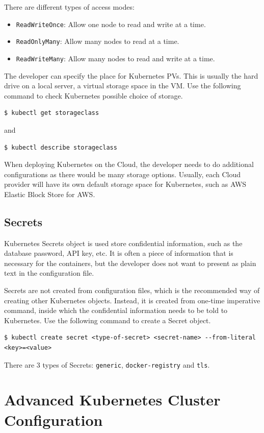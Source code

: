There are different types of access modes:
\begin{itemize}
	\item \verb|ReadWriteOnce|: Allow one node to read and write at a time.
	\item \verb|ReadOnlyMany|: Allow many nodes to read at a time.
	\item \verb|ReadWriteMany|: Allow many nodes to read and write at a time.
\end{itemize}

The developer can specify the place for Kubernetes PVs. This is usually the hard drive on a local server, a virtual storage space in the VM. Use the following command to check Kubernetes possible choice of storage.
\begin{lstlisting}
$ kubectl get storageclass
\end{lstlisting}
and
\begin{lstlisting}
$ kubectl describe storageclass
\end{lstlisting}
When deploying Kubernetes on the Cloud, the developer needs to do additional configurations as there would be many storage options. Usually, each Cloud provider will have its own default storage space for Kubernetes, such as AWS Elastic Block Store for AWS.

\subsection{Secrets} \label{ch:vac:subsec:k8ssecrets}

Kubernetes Secrets object is used store confidential information, such as the database password, API key, etc. It is often a piece of information that is necessary for the containers, but the developer does not want to present as plain text in the configuration file.

Secrets are not created from configuration files, which is the recommended way of creating other Kubernetes objects. Instead, it is created from one-time imperative command, inside which the confidential information needs to be told to Kubernetes. Use the following command to create a Secret object.
\begin{lstlisting}
$ kubectl create secret <type-of-secret> <secret-name> --from-literal <key>=<value>
\end{lstlisting}
There are 3 types of Secrets: \verb|generic|, \verb|docker-registry| and \verb|tls|.

\section{Advanced Kubernetes Cluster Configuration} \label{ch:vac:sec:kubernetesconfiguration}

